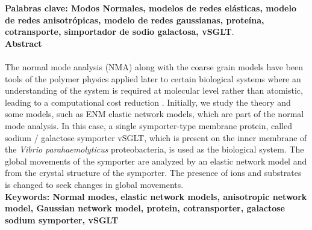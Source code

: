 \textbf{\small Palabras clave: Modos Normales, modelos de redes el\'{a}sticas, modelo de redes anisotr\'{o}picas, modelo de redes gaussianas, prote\'{i}na, cotransporte, simportador de sodio galactosa, vSGLT}.\\[2.0cm]
\textbf{\LARGE Abstract}\\\\
The normal mode analysis (NMA) along with the coarse grain models have been tools of the polymer physics applied later to certain biological systems where an understanding of the system is required at molecular level rather than atomistic, leading to a computational cost reduction . Initially, we study the theory and some models, such as  ENM elastic network models, which are part of the normal mode analysis. In this case, a single symporter-type membrane protein, called sodium / galactose symporter vSGLT, which is present on the inner membrane of the \textit{Vibrio parahaemolyticus} proteobacteria, is used as the biological system. The global movements of the symporter are analyzed by an elastic network model and from the crystal structure of the symporter. The presence of ions and substrates is changed to seek changes in global movements.\\

\textbf{\small Keywords: Normal modes, elastic network models, anisotropic network model, Gaussian network model, protein, cotransporter, galactose sodium symporter, vSGLT}\\